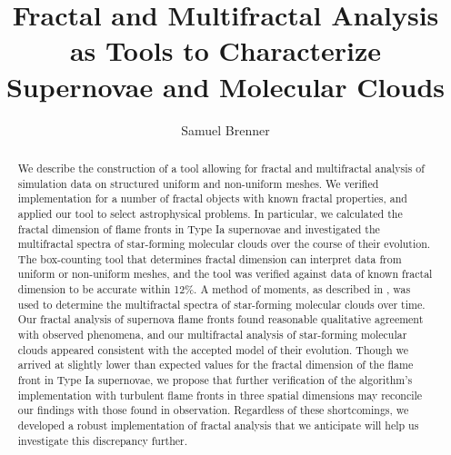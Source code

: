 \documentclass[iop]{emulateapj}
\begin{document}
%
\title{Fractal and Multifractal Analysis as Tools to Characterize Supernovae and Molecular Clouds}
%
\author{Samuel Brenner}

%
%
%
%
%
\begin{abstract}
We describe the construction of a tool allowing for fractal and multifractal analysis of simulation data on structured uniform and non-uniform meshes. We verified implementation for a number of fractal objects with known fractal properties, and applied our tool to select astrophysical problems. In particular, we calculated the fractal dimension of flame fronts in Type Ia supernovae and investigated the multifractal spectra of star-forming molecular clouds over the course of their evolution. The box-counting tool that determines fractal dimension can interpret data from uniform or non-uniform meshes, and the tool was verified against data of known fractal dimension to be accurate within 12\%. A method of moments, as described in \cite{Chhabra1989}, was used to determine the multifractal spectra of star-forming molecular clouds over time. Our fractal analysis of supernova flame fronts found reasonable qualitative agreement with observed phenomena, and our multifractal analysis of star-forming molecular clouds appeared consistent with the accepted model of their evolution. Though we arrived at slightly lower than expected values for the fractal dimension of the flame front in Type Ia supernovae, we propose that further verification of the algorithm's implementation with turbulent flame fronts in three spatial dimensions may reconcile our findings with those found in observation. Regardless of these shortcomings, we developed a robust implementation of fractal analysis that we anticipate will help us investigate this discrepancy further.


\end{abstract}
%
%
%
%
%
%
\end{document}

